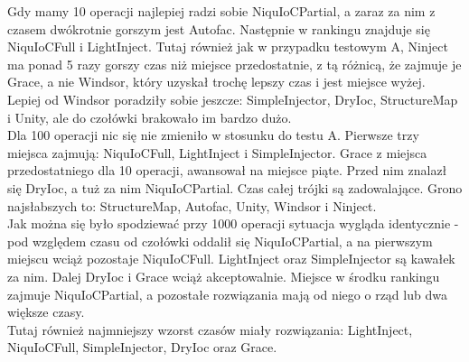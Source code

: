 \documentclass[12pt]{article}
\begin{document}
Gdy mamy 10 operacji najlepiej radzi sobie NiquIoCPartial, a zaraz za nim z czasem dwókrotnie gorszym jest Autofac. Następnie w rankingu znajduje się NiquIoCFull i LightInject. Tutaj również jak w przypadku testowym A, Ninject ma ponad 5 razy gorszy czas niż miejsce przedostatnie, z tą różnicą, że zajmuje je Grace, a nie Windsor, który uzyskał trochę lepszy czas i jest miejsce wyżej. Lepiej od Windsor poradziły sobie jeszcze: SimpleInjector, DryIoc, StructureMap i Unity, ale do czołówki brakowało im bardzo dużo.\\
Dla 100 operacji nic się nie zmieniło w stosunku do testu A. Pierwsze trzy miejsca zajmują: NiquIoCFull, LightInject i SimpleInjector. Grace z miejsca przedostatniego dla 10 operacji, awansował na miejsce piąte. Przed nim znalazł się DryIoc, a tuż za nim NiquIoCPartial. Czas całej trójki są zadowalające. Grono najsłabszych to: StructureMap, Autofac, Unity, Windsor i Ninject.\\
Jak można się było spodziewać przy 1000 operacji sytuacja wygląda identycznie - pod względem czasu od czołówki oddalił się NiquIoCPartial, a na pierwszym miejscu wciąż pozostaje NiquIoCFull. LightInject oraz SimpleInjector są kawałek za nim. Dalej DryIoc i Grace wciąż akceptowalnie. Miejsce w środku rankingu zajmuje NiquIoCPartial, a pozostałe rozwiązania mają od niego o rząd lub dwa większe czasy.\\
Tutaj również najmniejszy wzorst czasów miały rozwiązania: LightInject, NiquIoCFull, SimpleInjector, DryIoc oraz Grace.
\end{document}
